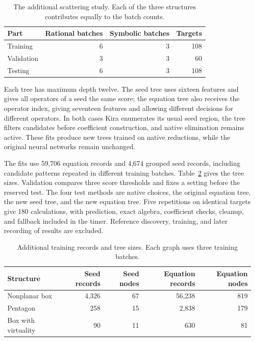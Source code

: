 \begin{table}[!htbp]
\centering\small
\caption{The additional scattering study. Each of the three structures contributes equally to the batch counts.}
\label{history:tab:scattering-split}
\begin{tabular}{@{}lrrr@{}}\toprule
Part & Rational batches & Symbolic batches & Targets\\\midrule
Training & 6 & 3 & 108\\
Validation & 3 & 3 & 60\\
Testing & 6 & 3 & 108\\\bottomrule
\end{tabular}
\end{table}

Each tree has maximum depth twelve. The seed tree uses sixteen features and gives all operators of a seed the same score; the equation tree also receives the operator index, giving seventeen features and allowing different decisions for different operators. In both cases Kira enumerates its usual seed region, the tree filters candidates before coefficient construction, and native elimination remains active. These fits produce new trees trained on native reductions, while the original neural networks remain unchanged.

The fits use 59,706 equation records and 4,674 grouped seed records, including candidate patterns repeated in different training batches. Table~\ref{history:tab:scattering-fit} gives the tree sizes. Validation compares three score thresholds and fixes a setting before the reserved test. The four test methods are native choices, the original equation tree, the new seed tree, and the new equation tree. Five repetitions on identical targets give 180 calculations, with prediction, exact algebra, coefficient checks, cleanup, and fallback included in the timer. Reference discovery, training, and later recording of results are excluded.

\begin{table}[!htbp]
\centering\small
\caption{Additional training records and tree sizes. Each graph uses three training batches.}
\label{history:tab:scattering-fit}
\begin{tabular}{@{}lrrrr@{}}\toprule
Structure & Seed records & Seed nodes & Equation records & Equation nodes\\\midrule
Nonplanar box & 4,326 & 67 & 56,238 & 819 \\
Pentagon & 258 & 15 & 2,838 & 179 \\
Box with virtuality & 90 & 11 & 630 & 81 \\
\bottomrule
\end{tabular}
\end{table}

